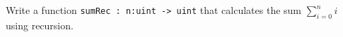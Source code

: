 Write a function \lstinline{sumRec : n:uint -> uint} that calculates the sum $\sum_{i=0}^ni$ using recursion.
